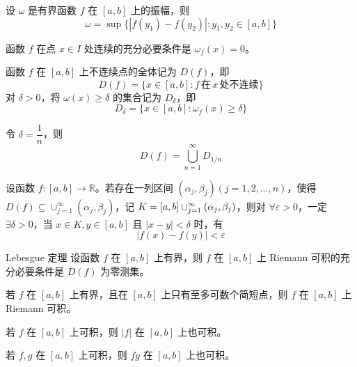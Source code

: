 \begin{lemma}
    设 $\omega$ 是有界函数 $f$ 在 $[a, b]$ 上的振幅，则
    \[\omega = \sup\{|f(y_1) - f(y_2)|:y_1,y_2 \in [a, b]\}\]
\end{lemma}

\begin{lemma}
    函数 $f$ 在点 $x \in I$ 处连续的充分必要条件是 $\omega_f(x) = 0$。
\end{lemma}

\begin{definition}
    函数 $f$ 在 $[a, b]$ 上不连续点的全体记为 $D(f)$，即
    \[D(f) = \{x \in [a, b] : f\, \text{在}\, x\, \text{处不连续}\}\]
    对 $\delta > 0$，将 $\omega(x) \geqslant \delta$ 的集合记为 $D_{\delta}$，即
    \[D_{\delta} = \{x \in [a, b] : \omega_{f}(x) \geqslant \delta\}\]
\end{definition}

\begin{lemma}
    令 $\delta = \dfrac{1}{n}$，则
    \[D(f) = \bigcup_{n = 1}^{\infty}D_{1/n}\]
\end{lemma}

\begin{lemma}
    设函数 $f : [a, b] \to \mathbb{R}$。若存在一列区间 $(\alpha_j,\beta_j)(j = 1,2, \ldots ,n)$，使得 $D(f) \subseteq \cup_{j = 1}^{\infty}(\alpha_j,\beta_j)$，记 $K = [a, b]\\ \cup_{j = 1}^{\infty}(\alpha_j,\beta_j)$，则对 $\forall \varepsilon > 0$，一定 $\exists \delta > 0$，当 $x \in K, y\in [a, b]$ 且 $|x - y| < \delta$ 时，有
    \[|f(x) - f(y)| < \varepsilon\]
\end{lemma}

\begin{theorem}{Lebesgue 定理}
    设函数 $f$ 在 $[a, b]$ 上有界，则 $f$ 在 $[a, b]$ 上 Riemann 可积的充分必要条件是 $D(f)$ 为零测集。
\end{theorem}

\begin{corollary}
    若 $f$ 在 $[a, b]$ 上有界，且在 $[a, b]$ 上只有至多可数个简短点，则 $f$ 在 $[a, b]$ 上 Riemann 可积。
\end{corollary}

\begin{corollary}
    若 $f$ 在 $[a, b]$ 上可积，则 $|f|$ 在 $[a, b]$ 上也可积。
\end{corollary}

\begin{corollary}
    若 $f,g$ 在 $[a, b]$ 上可积，则 $fg$ 在 $[a, b]$ 上也可积。
\end{corollary}

